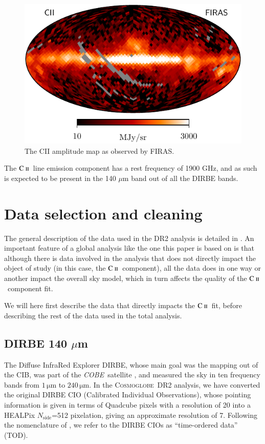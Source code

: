 \documentclass{aa}
\newcommand{\mathsc}[1]{{\normalfont\textsc{#1}}}
\def\Cosmoglobe{\textsc{Cosmoglobe}}
\def\COBE{\textit{COBE}}
\def\nside{$N_{\mathrm{side}}$}
\newcommand{\cii}{\ensuremath{\mathsc {C\ ii}}}
\begin{document}
\begin{figure}
    \centering
    \includegraphics[width=\columnwidth]{figures/init_CII_firas_n16_v20.pdf}
    \caption{The CII amplitude map as observed by FIRAS.}
    \label{fig:cii_firas}
\end{figure}

The \cii\ line emission component has a rest frequency of 1900 GHz, and as such
is expected to be present in the 140 $\mu$m band out of all the DIRBE bands.

\clearpage
\section{Data selection and cleaning}
The general description of the data used in the DR2 analysis is detailed in
\citet{CG02_01}. An important feature of a global analysis like the one this
paper is based on is that although there is data involved in the analysis that
does not directly impact the object of study (in this case, the \cii\
component), all the data does in one way or another impact the overall sky
model, which in turn affects the quality of the \cii\ component fit.

We will here first describe the data that directly impacts the \cii\ fit,
before describing the rest of the data used in the total analysis.

\subsection{DIRBE 140 $\mu$m}
The Diffuse InfraRed Explorer DIRBE, whose main goal was the mapping out of the
CIB, was part of the \COBE\ satellite \citep{boggess92, silverberg93}, and
measured the sky in ten frequency bands from $1\,\mathrm{\mu}$m to
$240\,\mathrm{\mu}$m. In the \Cosmoglobe\ DR2 analysis, we have converted the
original DIRBE CIO (Calibrated Individual Observations), whose pointing
information is given in terms of Quadcube pixels with a resolution of 20\arcs
into a HEALPix \nside=512 pixelation, giving an approximate resolution of
7\arcm. Following the nomenclature of \citet{CG02_01}, we refer to the DIRBE
CIOs as ``time-ordered data'' (TOD).
\end{document}
